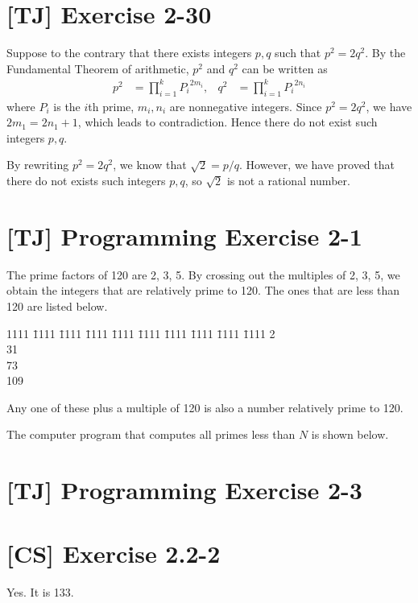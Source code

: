 \documentclass[a4paper,11pt,twocolumn]{article}
\begin{document}
  \section{[TJ] Exercise 2-30}
  Suppose to the contrary that there exists integers $p, q$ such that $p^2 = 2q^2$. By the Fundamental Theorem of arithmetic, $p^2$ and $q^2$ can be written as
  \begin{align*}
    p^2 &= \prod_{i=1}^{k} {P_i}^{2m_i},  &  q^2 &= \prod_{i=1}^{k} {P_i}^{2n_i}
  \end{align*}
  where $P_i$ is the $i$th prime, $m_i, n_i$ are nonnegative integers. Since $p^2 = 2q^2$, we have $2m_1 = 2n_1 + 1$, which leads to contradiction. Hence there do not exist such integers $p, q$. \par
  By rewriting $p^2 = 2q^2$, we know that $\sqrt{2} = p/q$. However, we have proved that there do not exists such integers $p, q$, so $\sqrt{2}$ is not a rational number.

  \section{[TJ] Programming Exercise 2-1}
  The prime factors of 120 are 2, 3, 5. By crossing out the multiples of 2, 3, 5, we obtain the integers that are relatively prime to 120. The ones that are less than 120 are listed below.
  \begin{tabbing}
    1111 \= 1111 \= 1111 \= 1111 \= 1111 \= 1111 \= 1111 \= 1111 \= 1111 \= 1111 \kill
    2          \\
    31          \\
    73          \\
    109  
  \end{tabbing}
  Any one of these plus a multiple of 120 is also a number relatively prime to 120. \par
  The computer program that computes all primes less than $N$ is shown below.
  

  \section{[TJ] Programming Exercise 2-3}
  

  \section{[CS] Exercise 2.2-2}
  Yes. It is 133.
\end{document}
